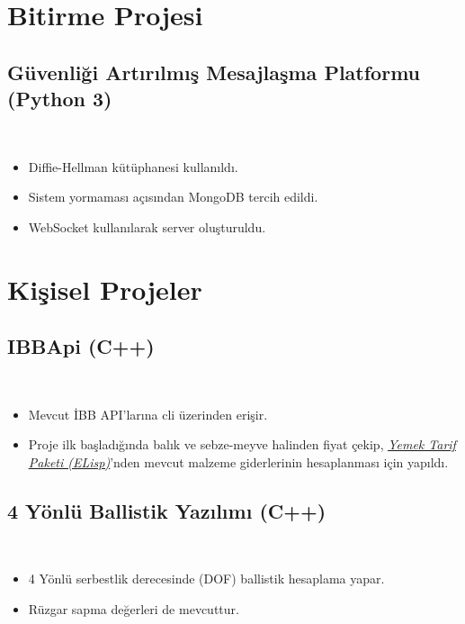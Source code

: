 \documentclass[a4paper, 9pt]{extarticle}
\begin{document}
\makebaslik{}
\myegitim{}
\mydeneyim{}

\section{Bitirme Projesi}

\subsection{Güvenliği Artırılmış Mesajlaşma Platformu (Python 3)}
\hfill \\
\begin{itemize}
	\item Diffie-Hellman kütüphanesi kullanıldı.
	\item Sistem yormaması açısından MongoDB tercih edildi.
	\item WebSocket kullanılarak server oluşturuldu.
\end{itemize}

\section{Kişisel Projeler}

\subsection{IBBApi (C++)} \hfill \\
\begin{itemize}
	\item Mevcut İBB API'larına cli üzerinden erişir.
	\item Proje ilk başladığında balık ve sebze-meyve halinden fiyat çekip,
	\underline{\emph{\hyperref[lisp:frp]{Yemek Tarif Paketi (ELisp)}}}'nden mevcut malzeme giderlerinin hesaplanması için yapıldı.
\end{itemize}

\subsection{4 Yönlü Ballistik Yazılımı (C++)} \hfill \\
\begin{itemize}
	\item 4 Yönlü serbestlik derecesinde (DOF) ballistik hesaplama yapar.
	\item Rüzgar sapma değerleri de mevcuttur.
\end{itemize}
\end{document}
